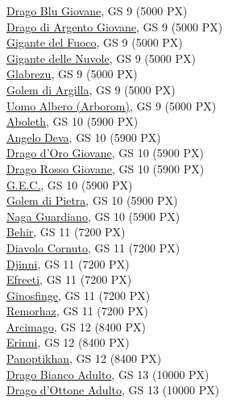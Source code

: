 \begin{multicols}{3}
{\hyperlink{Drago Blu Giovane}{Drago Blu Giovane}, GS 9 (5000 PX)\\
\hyperlink{Drago di Argento Giovane}{Drago di Argento Giovane}, GS 9 (5000 PX)\\
\hyperlink{Gigante del Fuoco}{Gigante del Fuoco}, GS 9 (5000 PX)\\
\hyperlink{Gigante delle Nuvole}{Gigante delle Nuvole}, GS 9 (5000 PX)\\
\hyperlink{Glabrezu}{Glabrezu}, GS 9 (5000 PX)\\
\hyperlink{Golem di Argilla}{Golem di Argilla}, GS 9 (5000 PX)\\
\hyperlink{Uomo Albero (Arborom)}{Uomo Albero (Arborom)}, GS 9 (5000 PX)\\
\hyperlink{Aboleth}{Aboleth}, GS 10 (5900 PX)\\
\hyperlink{Angelo Deva}{Angelo Deva}, GS 10 (5900 PX)\\
\hyperlink{Drago d'Oro Giovane}{Drago d'Oro Giovane}, GS 10 (5900 PX)\\
\hyperlink{Drago Rosso Giovane}{Drago Rosso Giovane}, GS 10 (5900 PX)\\
\hyperlink{G.E.C.}{G.E.C.}, GS 10 (5900 PX)\\
\hyperlink{Golem di Pietra}{Golem di Pietra}, GS 10 (5900 PX)\\
\hyperlink{Naga Guardiano}{Naga Guardiano}, GS 10 (5900 PX)\\
\hyperlink{Behir}{Behir}, GS 11 (7200 PX)\\
\hyperlink{Diavolo Cornuto}{Diavolo Cornuto}, GS 11 (7200 PX)\\
\hyperlink{Djinni}{Djinni}, GS 11 (7200 PX)\\
\hyperlink{Efreeti}{Efreeti}, GS 11 (7200 PX)\\
\hyperlink{Ginosfinge}{Ginosfinge}, GS 11 (7200 PX)\\
\hyperlink{Remorhaz}{Remorhaz}, GS 11 (7200 PX)\\
\hyperlink{Arcimago}{Arcimago}, GS 12 (8400 PX)\\
\hyperlink{Erinni}{Erinni}, GS 12 (8400 PX)\\
\hyperlink{Panoptikhan}{Panoptikhan}, GS 12 (8400 PX)\\
\hyperlink{Drago Bianco Adulto}{Drago Bianco Adulto}, GS 13 (10000 PX)\\
\hyperlink{Drago d'Ottone Adulto}{Drago d'Ottone Adulto}, GS 13 (10000 PX)\\
}
\end{multicols}
